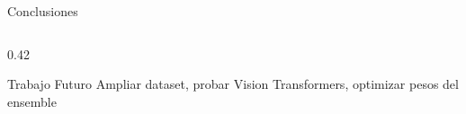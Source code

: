 \documentclass[aspectratio=169]{beamer}
\begin{document}
\begin{frame}{Conclusiones}
\begin{columns}[T]
\begin{column}{0.42\textwidth}
            \vspace{0.5cm}
            \begin{block}{Trabajo Futuro}
                \small
                Ampliar dataset, probar Vision Transformers, optimizar pesos del ensemble
            \end{block}
        \end{column}
    \end{columns}

\end{frame}
\end{document}
